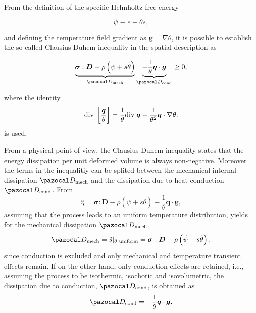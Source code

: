 From the definition of the specific Helmholtz free energy
\begin{highlight}
\begin{equation} \label{eq:def_helmholtz_free_energy}
    \psi \equiv e -\theta s,
\end{equation}
\end{highlight}
and defining the temperature field gradient as $\bm g=\nabla \theta$, it is possible to establish the so-called Clausius-Duhem inequality in the spatial description as
\begin{highlight}
    \begin{equation}
        \underbrace{\mat \sigma:\mat D - \rho\left(\dot \psi +s\dot \theta\right)}_{\pazocal D_\text{mech}} \underbrace{-\frac{1}{\theta}\vect q\cdot \vect g }_{\pazocal D_\text{cond}}\geq 0, \label{eq:clasius_duhem_eq}
    \end{equation}
\end{highlight}
where the identity
\begin{equation}
    \text{div}\;\left[\frac{\bm{q}}{\theta}\right] =\frac{1}{\theta}\text{div}\;\bm{q} -\frac{1}{\theta^2}\bm{q}\cdot \nabla \theta.
\end{equation}
is used.

From a physical point of view, the Clausius-Duhem inequality states that the energy dissipation per unit deformed volume is always non-negative.
Moreover the terms in the inequalitiy can be splited between the mechanical internal dissipation \(\pazocal D_\text{mech}\) and the dissipation due to heat conduction \(\pazocal D_\text{cond}\).
From
\begin{equation}
\hat \eta = \bm \sigma :\bm D - \rho \left(\dot \psi  +s \dot \theta\right) -\frac{1}{\theta}\bm q\cdot\bm g,
\end{equation}
assuming that the process leads to an uniform temperature distribution, yields for the mechanical dissipation \(\pazocal D_\text{mech}\),
\begin{equation}
\pazocal D_\text{mech} = \hat{s}|_{\text{$\theta$ uniform} }= \bm \sigma:\bm D - \rho \left(\dot \psi + s \dot \theta\right),
\end{equation}
since conduction is excluded and only mechanical and temperature transient effects remain.
If on the other hand, only conduction effects are retained, i.e., assuming the process to be isothermic, isochoric and isovolumetric, the dissipation due to conduction, \(\pazocal D_\text{cond}\), is obtained as
\begin{equation}
\pazocal D_\text{cond} = - \frac{1}{\theta} \bm q\cdot \bm g.
\end{equation}

